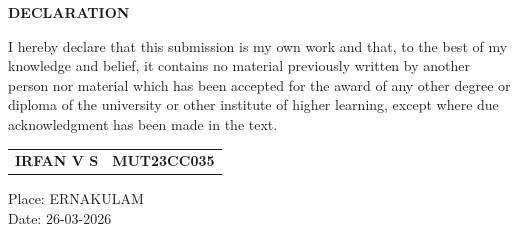 \documentclass[a4paper,12pt,oneside]{report}
\begin{document}
\begin{titlepage}
{\scshape \centering \Large \bfseries DECLARATION \par}
\vspace{1.5cm}
{I hereby declare that this submission is my own work and that, to the best of my knowledge and belief, it contains no material previously written by another person nor material which has been accepted for the award of any other degree or diploma of the university or other institute of higher learning, except where due acknowledgment has been made in the text.}
\vspace{2cm}
\begin{flushright}
\begin{tabular}{lr}
\textbf{IRFAN V S} & \textbf{MUT23CC035} \\
\end{tabular}
\end{flushright}
\par

\vfill
\noindent Place: ERNAKULAM\\
\noindent Date: 26-03-2026
\end{titlepage}
\end{document}
